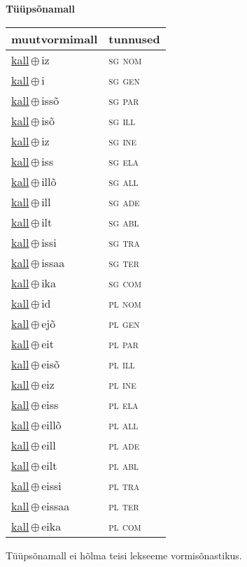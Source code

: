 

\vspace{3.5em}
\noindent \begin{minipage}{\textwidth}
\noindent \textbf{Tüüpsõnamall \,}\\

\begin{sideways}
\begin{tabular}{l l}
muutvormimall & tunnused \\
\hline
\underline{kall}\,$\oplus$\,iz & \textsc{ sg nom } \\
\underline{kall}\,$\oplus$\,i & \textsc{ sg gen } \\
\underline{kall}\,$\oplus$\,issõ & \textsc{ sg par } \\
\underline{kall}\,$\oplus$\,isõ & \textsc{ sg ill } \\
\underline{kall}\,$\oplus$\,iz & \textsc{ sg ine } \\
\underline{kall}\,$\oplus$\,iss & \textsc{ sg ela } \\
\underline{kall}\,$\oplus$\,illõ & \textsc{ sg all } \\
\underline{kall}\,$\oplus$\,ill & \textsc{ sg ade } \\
\underline{kall}\,$\oplus$\,ilt & \textsc{ sg abl } \\
\underline{kall}\,$\oplus$\,issi & \textsc{ sg tra } \\
\underline{kall}\,$\oplus$\,issaa & \textsc{ sg ter } \\
\underline{kall}\,$\oplus$\,ika & \textsc{ sg com } \\
\underline{kall}\,$\oplus$\,id & \textsc{ pl nom } \\
\underline{kall}\,$\oplus$\,ejõ & \textsc{ pl gen } \\
\underline{kall}\,$\oplus$\,eit & \textsc{ pl par } \\
\underline{kall}\,$\oplus$\,eisõ & \textsc{ pl ill } \\
\underline{kall}\,$\oplus$\,eiz & \textsc{ pl ine } \\
\underline{kall}\,$\oplus$\,eiss & \textsc{ pl ela } \\
\underline{kall}\,$\oplus$\,eillõ & \textsc{ pl all } \\
\underline{kall}\,$\oplus$\,eill & \textsc{ pl ade } \\
\underline{kall}\,$\oplus$\,eilt & \textsc{ pl abl } \\
\underline{kall}\,$\oplus$\,eissi & \textsc{ pl tra } \\
\underline{kall}\,$\oplus$\,eissaa & \textsc{ pl ter } \\
\underline{kall}\,$\oplus$\,eika & \textsc{ pl com } \\
\end{tabular}
\end{sideways}
\label{tab:tüüpsõnamall-kalliz}

\end{minipage}

 
\vspace{1em}
\noindent Tüüpsõnamall  ei hõlma teisi lekseeme vormi\-sõnastikus.
